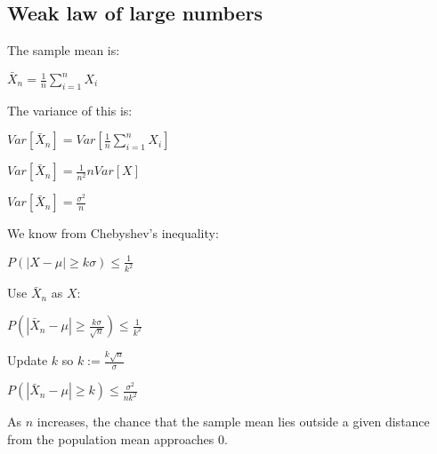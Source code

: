 
\subsection{Weak law of large numbers}

The sample mean is:

\(\bar X_n=\frac{1}{n}\sum_{i=1}^nX_i\)

The variance of this is:

\(Var[\bar X_n]=Var[\frac{1}{n}\sum_{i=1}^nX_i]\)

\(Var[\bar X_n]=\frac{1}{n^2}nVar[X]\)

\(Var[\bar X_n]=\frac{\sigma^2}{n} \)

We know from Chebyshev’s inequality:

\(P(|X-\mu | \ge k\sigma )\le \frac{1}{k^2}\)

Use \(\bar X_n\) as \(X\):

\(P(|\bar X_n-\mu | \ge \frac{k\sigma }{\sqrt n})\le \frac{1}{k^2}\)

Update \(k\) so \(k:=\frac{k\sqrt n}{\sigma}\)

\(P(|\bar X_n-\mu | \ge k)\le \frac{\sigma^2}{nk^2}\)

As \(n\) increases, the chance that the sample mean lies outside a given distance from the population mean approaches \(0\).

